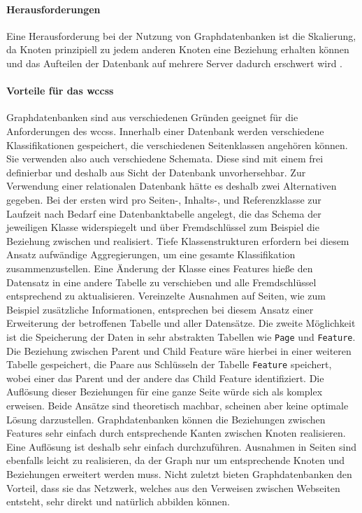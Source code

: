     \paragraph{Herausforderungen}
    Eine Herausforderung bei der Nutzung von Graphdatenbanken ist die Skalierung,
    da Knoten prinzipiell zu jedem anderen Knoten eine Beziehung erhalten können
    und das Aufteilen der Datenbank auf mehrere Server dadurch erschwert wird
    \cite[Kapitel 11.2.5]{sadalage:nosql}.

    \paragraph{Vorteile für das \glspl{wccs}}
    Graphdatenbanken sind aus verschiedenen Gründen geeignet für die Anforderungen des \glspl{wccs}.
    Innerhalb einer Datenbank werden verschiedene Klassifikationen gespeichert,
    die verschiedenen Seitenklassen angehören können.
    Sie verwenden also auch verschiedene Schemata.
    Diese sind mit einem {\classificationModel} frei definierbar und deshalb aus Sicht der Datenbank unvorhersehbar.
    Zur Verwendung einer relationalen Datenbank hätte es deshalb zwei Alternativen gegeben.
    Bei der ersten wird pro Seiten-, Inhalts-, und Referenzklasse zur Laufzeit nach Bedarf eine Datenbanktabelle angelegt,
    die das Schema der jeweiligen Klasse widerspiegelt und über Fremdschlüssel zum Beispiel die Beziehung
    zwischen {\parentFeature} und {\childFeature} realisiert.
    Tiefe Klassenstrukturen erfordern bei diesem Ansatz aufwändige Aggregierungen,
    um eine gesamte Klassifikation zusammenzustellen.
    Eine Änderung der Klasse eines Features hieße den Datensatz in eine andere Tabelle zu verschieben
    und alle Fremdschlüssel entsprechend zu aktualisieren.
    Vereinzelte Ausnahmen auf Seiten, wie zum Beispiel zusätzliche Informationen, entsprechen bei diesem Ansatz
    einer Erweiterung der betroffenen Tabelle und aller Datensätze.
    Die zweite Möglichkeit ist die Speicherung der Daten in sehr abstrakten Tabellen
    wie \texttt{Page} und \texttt{Feature}.
    Die Beziehung zwischen Parent und Child Feature wäre hierbei in einer weiteren Tabelle gespeichert,
    die Paare aus Schlüsseln der Tabelle \texttt{Feature} speichert, wobei einer das Parent und der andere das
    Child Feature identifiziert.
    Die Auflösung dieser Beziehungen für eine ganze Seite würde sich als komplex erweisen.
    Beide Ansätze sind theoretisch machbar, scheinen aber keine optimale Lösung darzustellen.
    Graphdatenbanken können die Beziehungen zwischen Features sehr einfach durch entsprechende Kanten zwischen Knoten realisieren.
    Eine Auflösung ist deshalb sehr einfach durchzuführen.
    Ausnahmen in Seiten sind ebenfalls leicht zu realisieren,
    da der Graph nur um entsprechende Knoten und Beziehungen erweitert werden muss.
    Nicht zuletzt bieten Graphdatenbanken den Vorteil,
    dass sie das Netzwerk, welches aus den Verweisen zwischen
    Webseiten entsteht, sehr direkt und natürlich abbilden können.
